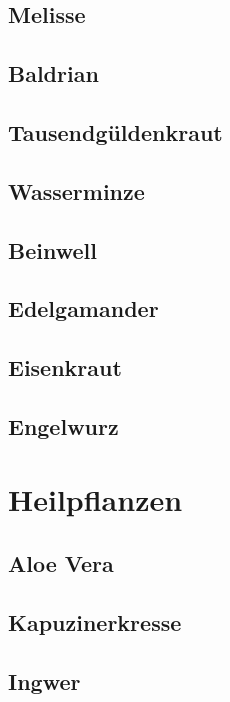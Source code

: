 \subsection{Melisse}

\subsection{Baldrian}

\subsection{Tausendgüldenkraut}

\subsection{Wasserminze}

\subsection{Beinwell}

\subsection{Edelgamander}

\subsection{Eisenkraut}

\subsection{Engelwurz}



\section{Heilpflanzen}

\lipsum[2]

\subsection{Aloe Vera}

\subsection{Kapuzinerkresse}

\subsection{Ingwer}

